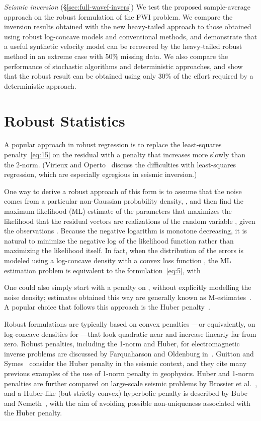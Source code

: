 \documentclass[nospthms]{svjour3}
\numberwithin{equation}{section}
\begin{document}
{\it Seismic inversion} (\S\ref{sec:full-wavef-invers}) We test the
proposed sample-average approach on the robust formulation of the FWI
problem. We compare the inversion results obtained with the new
heavy-tailed approach to those obtained using robust log-concave
models and conventional methods, and demonstrate that a useful
synthetic velocity model can be recovered by the heavy-tailed robust
method in an extreme case with 50\% missing data.  We also compare the
performance of stochastic algorithms and deterministic approaches, and
show that the robust result can be obtained using only 30\% of the
effort required by a deterministic approach.


\section{Robust Statistics}
\label{sec:mle}

A popular approach in robust regression is to replace the
least-squares penalty~\eqref{eq:15} on the residual with a penalty
that increases more slowly than the 2-norm. (Virieux and
Operto~\cite{VirieuxOperto2009} discuss the difficulties with
least-squares regression, which are especially egregious in seismic
inversion.)


One way to derive a robust approach of this form is to assume that the
noise  comes from a particular non-Gaussian probability
density, , and then find the maximum likelihood (ML)
estimate of the parameters  that maximizes the
likelihood that the residual vectors  are realizations of the
random variable , given the observations . Because
the negative logarithm is monotone decreasing, it is natural to
minimize the negative log of the likelihood function rather than
maximizing the likelihood itself. In fact, when the distribution of
the errors  is modeled using a log-concave density  with a convex loss function ,
the ML estimation problem is equivalent to the
formulation~\eqref{eq:5}, with


One could also simply start with a penalty  on , without
explicitly modelling the noise density; estimates obtained this way
are generally known as M-estimates~\cite{Huber:1981}.  A popular
choice that follows this approach is the Huber
penalty~\cite{Huber:1981,HubRon,Mar}.

Robust formulations are typically based on convex penalties ---or
equivalently, on log-concave densities for ---that look quadratic near  and increase linearly far from zero.
Robust penalties, including the 1-norm and Huber, for electromagnetic
inverse problems are discussed by Farquaharson and Oldenburg
in~\cite{GJI:GJI555}.  Guitton and Symes~\cite{Symes2003} consider the
Huber penalty in the seismic context, and they cite many previous
examples of the use of 1-norm penalty in geophysics. Huber and 1-norm
penalties are further compared on large-scale seismic problems by
Brossier et al.~\cite{Brossier2010}, and a Huber-like (but strictly
convex) hyperbolic penalty is described by Bube and
Nemeth~\cite{Bube2007}, with the aim of avoiding possible
non-uniqueness associated with the Huber penalty.
\end{document}

